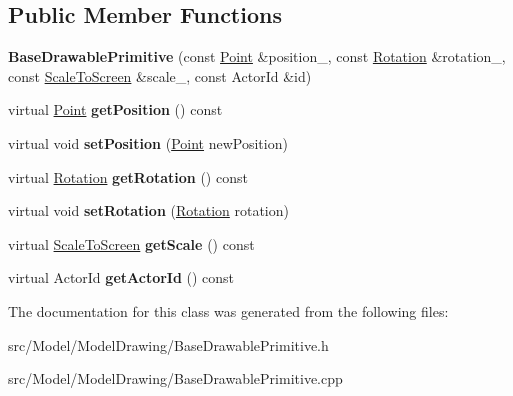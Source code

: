 \subsection*{Public Member Functions}
\begin{DoxyCompactItemize}
\item 
{\bfseries Base\+Drawable\+Primitive} (const \hyperlink{classPoint}{Point} \&position\+\_\+, const \hyperlink{classRotation}{Rotation} \&rotation\+\_\+, const \hyperlink{classScaleToScreen}{Scale\+To\+Screen} \&scale\+\_\+, const Actor\+Id \&id)\hypertarget{classBaseDrawablePrimitive_abd4da57d477eb4447f6326f0ed475873}{}\label{classBaseDrawablePrimitive_abd4da57d477eb4447f6326f0ed475873}

\item 
virtual \hyperlink{classPoint}{Point} {\bfseries get\+Position} () const \hypertarget{classBaseDrawablePrimitive_a4ed6d252dbe6ad464a22f18881b0fd01}{}\label{classBaseDrawablePrimitive_a4ed6d252dbe6ad464a22f18881b0fd01}

\item 
virtual void {\bfseries set\+Position} (\hyperlink{classPoint}{Point} new\+Position)\hypertarget{classBaseDrawablePrimitive_a09e32b302f1c861febcf5bc657015b11}{}\label{classBaseDrawablePrimitive_a09e32b302f1c861febcf5bc657015b11}

\item 
virtual \hyperlink{classRotation}{Rotation} {\bfseries get\+Rotation} () const \hypertarget{classBaseDrawablePrimitive_ae5d0896c69a2e8239f1cf3fea4b79c19}{}\label{classBaseDrawablePrimitive_ae5d0896c69a2e8239f1cf3fea4b79c19}

\item 
virtual void {\bfseries set\+Rotation} (\hyperlink{classRotation}{Rotation} rotation)\hypertarget{classBaseDrawablePrimitive_a79b5dbb3a600b0d96fd1d16c34d8d16b}{}\label{classBaseDrawablePrimitive_a79b5dbb3a600b0d96fd1d16c34d8d16b}

\item 
virtual \hyperlink{classScaleToScreen}{Scale\+To\+Screen} {\bfseries get\+Scale} () const \hypertarget{classBaseDrawablePrimitive_ab83c1407de521d94f95afc7b7b92cba3}{}\label{classBaseDrawablePrimitive_ab83c1407de521d94f95afc7b7b92cba3}

\item 
virtual Actor\+Id {\bfseries get\+Actor\+Id} () const \hypertarget{classBaseDrawablePrimitive_a01e16048f7aecfd38a8a32ed1db1f9d3}{}\label{classBaseDrawablePrimitive_a01e16048f7aecfd38a8a32ed1db1f9d3}

\end{DoxyCompactItemize}


The documentation for this class was generated from the following files\+:\begin{DoxyCompactItemize}
\item 
src/\+Model/\+Model\+Drawing/Base\+Drawable\+Primitive.\+h\item 
src/\+Model/\+Model\+Drawing/Base\+Drawable\+Primitive.\+cpp\end{DoxyCompactItemize}
